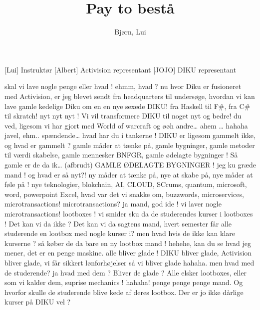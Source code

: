 \documentclass[a4paper,11pt]{article}
\title{Pay to bestå}
\author{Bjørn, Lui}
\begin{document}
\maketitle

\begin{roles}
[Lui] Instruktør
 [Albert] Activision representant 
 [JOJO] DIKU representant
\end{roles}

\begin{props}

\end{props}


\begin{sketch}
 skal vi lave nogle penge eller hvad !
 ehmm, hvad ? 
 nu hvor Diku er fusioneret med Activision, er jeg blevet sendt fra headquarters til undersøge, hvordan vi kan lave gamle kedelige Diku om en en nye sexede DIKU! fra Haskell til F#, fra C# til skratch! nyt nyt nyt ! Vi vil transformere DIKU til noget nyt og bedre!  du ved, ligesom vi har gjort med World of warcraft  og øøh andre… ahem … hahaha
 javel, ehm.. spændende… hvad har du i tankerne !
 DIKU er ligesom gammelt ikke, og hvad er gammelt ? gamle måder at tænke på, gamle bygninger, gamle metoder til værdi skabelse, gamle mennesker BNFGR, gamle ødelagte bygninger ! 
 Så gamle er de da ik… (afbrudt)
 GAMLE ØDELAGTE BYGNINGER ! jeg ku græde mand ! og hvad er så nyt?! ny måder at tænke på, nye at skabe på, nye måder at føle på ! nye teknologier, blokchain, AI, CLOUD, SCrums, quantum, microsoft, word, powerpoint Excel, hvad var det vi snakke om, buzzwords, microservices, microtransactions!
 microtransactions?
 ja mand, god ide ! vi laver nogle microtransactions! lootboxes ! vi smider sku da de studerendes kurser i lootboxes !
 Det kan vi da ikke ? 
 Det kan vi da sagtens mand, hvert semester får alle studerende en lootbox med nogle kurser i?
 men hvad hvis de ikke kan klare kurserne ?
 så køber de da bare en ny lootbox mand ! hehehe, kan du se hvad jeg mener, det er en penge maskine. alle bliver glade ! DIKU bliver glade, Activision bliver glade, vi får sikkert lønforhøjelser så vi bliver glade hahaha.
 men hvad med de studerende?
 ja hvad med dem ?
 Bliver de glade ?
 Alle elsker lootboxes, eller som vi kalder dem, suprise mechanics ! hahaha! penge penge penge mand. Og hvorfor skulle de studerende blive kede af deres lootbox. Der er jo ikke dårlige kurser på DIKU vel ? 

\end{sketch}
\end{document}
